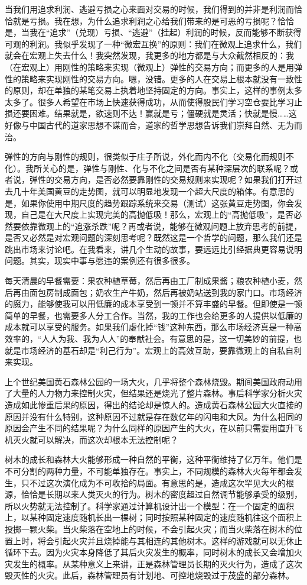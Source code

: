 当我们用追求利润、逃避亏损之心来面对交易的时候，我们得到的并非是利润而恰恰就是亏损。我在想，为什么追求利润之心给我们带来的是可恶的亏损呢？恰恰是，当我在“追求”（兑现）亏损、“逃避”（挂起）利润的时候，反而能够不断获得可观的利润。我似乎发现了一种“微宏互换”的原则：我们在微观上追求什么，我们就会在宏观上失去什么！我突然发现，我更多的地方都是与大众截然相反的：我（在宏观上）用刚性的策略来实现（微观上）弹性的交易方向；而更多的人是用弹性的策略来实现刚性的交易方向。嗯，没错。更多的人在交易上根本就没有一致性的原则，却在单独的某笔交易上执着地坚持固定的方向。事实上，这样的事例太多太多了。很多人希望在市场上快速获得成功，从而使得股民们学习空仓要比学习止损还要困难。结果就是，欲速则不达！赢就是亏；僵硬就是灵活；快就是慢……这好像与中国古代的道家思想不谋而合，道家的哲学思想告诉我们崇拜自然、无为而治。

弹性的方向与刚性的规则，很类似于庄子所说，外化而内不化（交易化而规则不化）。我所关心的是，弹性与刚性、化与不化之间是否有某种深层次的联系呢？或者说，弹性的交易方向，是否必然要靠刚性的交易规则来实现呢？如果我们打开过去几十年美国黄豆的走势图，就可以明显地发现一个超大尺度的箱体。有意思的是，如果你使用中期尺度的趋势跟踪系统来交易（测试）这张黄豆走势图，你会发现，自己是在大尺度上实现完美的高抛低吸！那么，宏观上的“高抛低吸”，是否必然要依靠微观上的“追涨杀跌”呢？再或者说，能够在微观问题上放弃思考的前提，是否又必然是对宏观问题的深刻思考呢？既然这是一个哲学的问题，那么我们还是跳出市场来讨论吧。在我看来，讲几个生动的故事，要远远比引经据典更容易说明问题。其实，现实中事与愿违的案例还有很多很多。

每天清晨的早餐需要：果农种植草莓，然后再由工厂制成果酱；粮农种植小麦，然后再由面包房制成面包；奶农生产牛奶，然后再被奶站送到我的家门口。市场经济的魔力，能够使我可以用低廉的成本享受到一顿并不算丰盛的早餐。但即使是一顿简单的早餐，也需要多人分工合作。当然，我的工作也会给更多的人提供以低廉的成本就可以享受的服务。如果我们虚化掉“钱”这种东西，那么市场经济真是一种高效率的，“人人为我、我为人人”的奉献社会。有意思的是，这一切美妙的前提，也就是市场经济的基石却是“利己行为”。宏观上的高效互助，要靠微观上的自私自利来实现。

上个世纪美国黄石森林公园的一场大火，几乎将整个森林烧毁。期间美国政府动用了大量的人力物力来控制火灾，但结果还是烧光了整片森林。事后科学家分析火灾造成如此惨重后果的原因，得出的结论却是惊人的。造成黄石森林公园大火直接的原因并没有什么特别，这种原因不过就是存在数亿年的闪电和大风。为什么相同的原因会产生不同的结果呢？为什么同样的原因产生的大火，在以前只需要用直升飞机灭火就可以解决，而这次却根本无法控制呢？

树木的成长和森林大火能够形成一种自然的平衡，这种平衡维持了亿万年。他们是不可分割的两种力量，不可能单独存在。事实上，不同规模的森林大火每年都会发生，只不过这次演化成为不可收拾的局面。有意思的是，造成这次罕见大火的根源，恰恰是长期以来人类灭火的行为。树木的密度超过自然调节能够承受的级别，所以火势就无法控制了。科学家通过计算机设计出一个模型：在一个固定的面积上，以某种固定速度随机长出一棵树；同时按照某种固定的速度随机往这个面积上投掷一颗火柴。当火柴落在空地上的时候，不会引起火灾；而当火柴落在树木的位置上时，将会引起火灾并且烧掉能与其相连的其他树木。这样的游戏就可以无休止循环下去。因为火灾本身降低了其后火灾发生的概率，同时树木的成长又会增加火灾发生的概率。从某种意义上来讲，正是森林管理员长期的灭火行为，造成了这次毁灭性的火灾。此后，森林管理员有计划地、可控地烧毁过于茂盛的部分森林。

